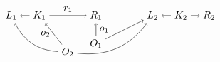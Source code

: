 \begin{definition}
\begin{itemize}
\[\begin{tikzpicture}
  \node (o) at (-1,-1) {\(O_1\)};
  \node (o2) at (-2,-1.3) {\(O_2\)};
  \node (r1) at (-1,0) {\(R_1\)};
  \node (k1) at (-3,0) {\(K_1\)};
  \node (l1) at (-4,0) {\(L_1\)};
  \node (l2) at (1,0) {\(L_2\)};
  \node (k2) at (2,0) {\(K_2\)};
  \node (r2) at (3,0) {\(R_2\)};
  \draw [->] (o) -- node [right,midway] {\(o_1\)} (r1);
  \draw [->] (o) -- (l2);
  \draw [->] (k1) -- node [above,midway] {\(r_1\)} (r1);
  \draw [->] (k1) -- (l1);
  \draw [->] (k2) -- (r2);
  \draw [->] (k2) -- (l2);
  \draw [->] (o2) to [bend left] (l1);
  \draw [->] (o2) to [bend right] (l2);
  \draw [->] (o2) -- node [left,midway] {\(o_2\)} (k1);
  \end{tikzpicture}
  \]
  \end{itemize}
\end{definition}
